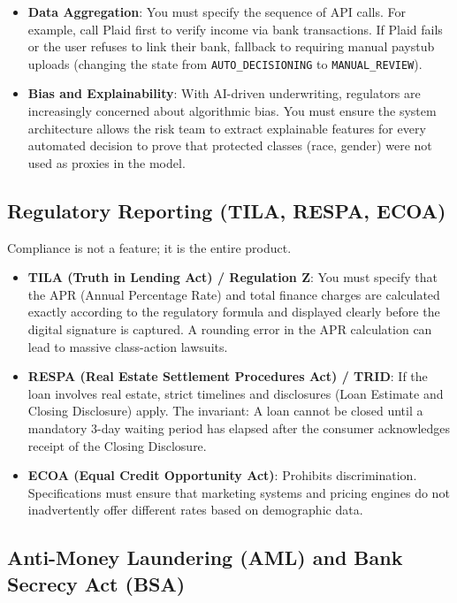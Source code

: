 \begin{itemize}
\tightlist
\item
  \textbf{Data Aggregation}: You must specify the sequence of API calls.
  For example, call Plaid first to verify income via bank transactions.
  If Plaid fails or the user refuses to link their bank, fallback to
  requiring manual paystub uploads (changing the state from
  \texttt{AUTO\_DECISIONING} to \texttt{MANUAL\_REVIEW}).
\item
  \textbf{Bias and Explainability}: With AI-driven underwriting,
  regulators are increasingly concerned about algorithmic bias. You must
  ensure the system architecture allows the risk team to extract
  explainable features for every automated decision to prove that
  protected classes (race, gender) were not used as proxies in the
  model.
\end{itemize}

\subsection{Regulatory Reporting (TILA, RESPA,
ECOA)}\label{regulatory-reporting-tila-respa-ecoa}

Compliance is not a feature; it is the entire product.

\begin{itemize}
\tightlist
\item
  \textbf{TILA (Truth in Lending Act) / Regulation Z}: You must specify
  that the APR (Annual Percentage Rate) and total finance charges are
  calculated exactly according to the regulatory formula and displayed
  clearly before the digital signature is captured. A rounding error in
  the APR calculation can lead to massive class-action lawsuits.
\item
  \textbf{RESPA (Real Estate Settlement Procedures Act) / TRID}: If the
  loan involves real estate, strict timelines and disclosures (Loan
  Estimate and Closing Disclosure) apply. The invariant: A loan cannot
  be closed until a mandatory 3-day waiting period has elapsed after the
  consumer acknowledges receipt of the Closing Disclosure.
\item
  \textbf{ECOA (Equal Credit Opportunity Act)}: Prohibits
  discrimination. Specifications must ensure that marketing systems and
  pricing engines do not inadvertently offer different rates based on
  demographic data.
\end{itemize}

\subsection{Anti-Money Laundering (AML) and Bank Secrecy Act
(BSA)}\label{anti-money-laundering-aml-and-bank-secrecy-act-bsa}

